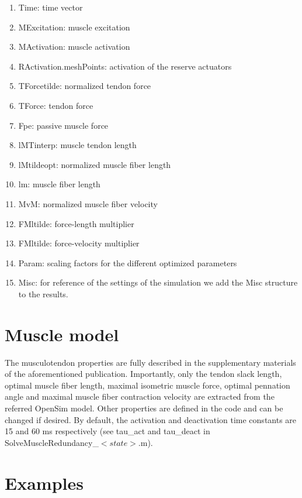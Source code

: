 \documentclass[a4paper,oneside,11pt]{article}
\begin{document}
\begin{enumerate}
	\item Time: time vector
	\item MExcitation: muscle excitation 
	\item MActivation: muscle activation
	\item RActivation.meshPoints: activation of the reserve actuators
	\item TForcetilde: normalized tendon force 
	\item TForce: tendon force 
	\item Fpe: passive muscle force
	\item lMTinterp: muscle tendon length
	\item lMtildeopt: normalized muscle fiber length
	\item lm: muscle fiber length
	\item MvM: normalized muscle fiber velocity
	\item FMltilde: force-length multiplier 
	\item FMltilde: force-velocity multiplier 
	\item Param: scaling factors for the different optimized parameters	
	\item Misc: for reference of the settings of the simulation we add the Misc structure to the results.	
\end{enumerate}

\section{Muscle model}

The musculotendon properties are fully described in the supplementary materials of the aforementioned publication. Importantly, only the tendon slack length, optimal muscle fiber length, maximal isometric muscle force, optimal pennation angle and maximal muscle fiber contraction velocity are extracted from the referred OpenSim model. Other properties are defined in the code and can be changed if desired. By default, the activation and deactivation time constants are 15 and 60 ms respectively (see tau_act and tau_deact in SolveMuscleRedundancy_$<state>$.m).


\section{Examples}
\label{Examples}
\end{document}
